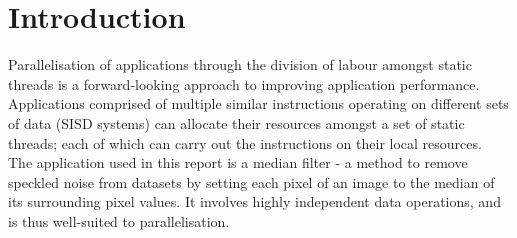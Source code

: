 \section{Introduction}

Parallelisation of applications through the division of labour amongst static threads is a forward-looking approach to improving application performance. Applications comprised of multiple similar instructions operating on different sets of data (SISD systems) can allocate their resources amongst a set of static threads; each of which can carry out the instructions on their local resources.\\

The application used in this report is a median filter - a method to remove speckled noise from datasets by setting each pixel of an image to the median of its surrounding pixel values. It involves highly independent data operations, and is thus well-suited to parallelisation.